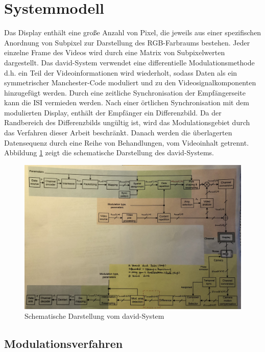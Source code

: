 \section{Systemmodell} 
Das Display enthält eine große Anzahl von Pixel, die jeweils aus einer spezifischen Anordnung von Subpixel zur Darstellung des RGB-Farbraums bestehen. Jeder einzelne Frame des Videos wird durch eine Matrix von Subpixelwerten dargestellt. Das \gls{david}-System verwendet eine differentielle Modulationsmethode d.h. ein Teil der Videoinformationen wird wiederholt, sodass Daten als ein symmetrischer Manchester-Code moduliert und zu den Videosignalkomponenten hinzugefügt werden. Durch eine zeitliche Synchronisation der Empfängerseite kann die \gls{ISI} vermieden werden. Nach einer örtlichen Synchronisation mit dem modulierten Display, enthält der Empfänger ein Differenzbild. Da der Randbereich des Differenzbilds ungültig ist, wird das Modulationsgebiet durch das Verfahren dieser Arbeit beschränkt. Danach werden die überlagerten Datensequenz durch eine Reihe von Behandlungen, vom Videoinhalt getrennt. Abbildung \ref{fig:David2} zeigt die schematische Darstellung des \gls{david}-Systems. 
\vspace{18pt}

\begin{figure}[htb]
	\centering 
	\includegraphics[keepaspectratio,width=1.0\textwidth]{images/2_DaViD/David3.jpg}
	\caption{Schematische Darstellung vom \gls{david}-System}
	\label{fig:David2}
\end{figure}


\subsection{Modulationsverfahren}

